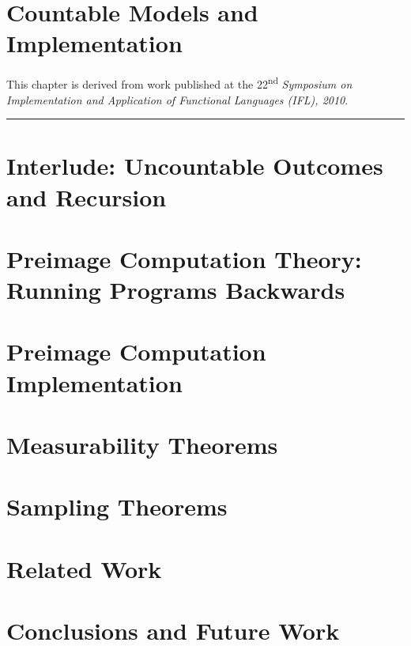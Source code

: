 \documentclass[phd,electronic,twosidetoc,letterpaper,chaptercenter,parttop,lof]{byumsphd}
\begin{document}



\chapter{Countable Models and Implementation}
\label{ch:countable-models}

This chapter is derived from work published at the 22\textsuperscript{nd} \emph{Symposium on Implementation and Application of Functional Languages (IFL), 2010}.

\vspace{\baselineskip}
\hrule
\vspace{\baselineskip}



\chapter{Interlude: Uncountable Outcomes and Recursion}
\label{ch:interlude}




\chapter{Preimage Computation Theory: Running Programs Backwards}
\label{ch:preimage1}




\chapter{Preimage Computation Implementation}
\label{ch:preimage2}




\chapter{Measurability Theorems}
\label{ch:measurability}




\chapter{Sampling Theorems}
\label{ch:sampling-algorithm-proofs}




\chapter{Related Work}




\chapter{Conclusions and Future Work}






\end{document}
